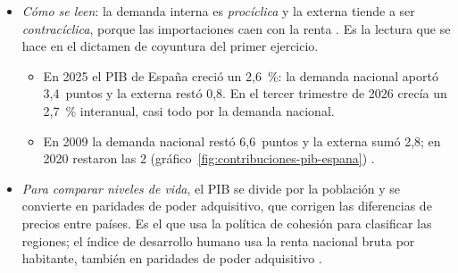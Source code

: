 \documentclass[11pt]{article}
\begin{document}
\begin{itemize}
  \begin{itemize}
  \item \emph{En palabras}: cada contribución es el \emph{peso} del componente en el año anterior por su \emph{crecimiento} de este año, y se mide en \uline{puntos porcentuales, no en porcentaje}. Las importaciones restan; las existencias también contribuyen.
  \item Por ejemplo, con un PIB de 100, si el consumo pesa 60~y crece un 2~\%, la inversión pesa 20~y crece un 5~\%, el consumo público pesa 20~y crece un 1~\%, y las exportaciones y las importaciones pesan 30~cada una y crecen un 4~y un 6~\%, la demanda interna aporta $1{,}2+1{,}0+0{,}2=2{,}4$ puntos, la externa resta $1{,}2-1{,}8=-0{,}6$, y el PIB crece un 1,8~\%.
  \item \emph{La cautela de los volúmenes encadenados}: los componentes en euros encadenados \emph{no suman} el PIB encadenado, salvo en el año de referencia y el siguiente (la ). Las contribuciones sí suman si cada peso es la participación \emph{nominal} del componente en el año anterior; por eso se usan las que publica el INE (anexo~\ref{anexo:encadenados})\nocite{Eurostat2013QNA}.
  \end{itemize}
\item \emph{Cómo se leen}: la demanda interna es \emph{procíclica} y la externa tiende a ser \emph{contracíclica}, porque las importaciones caen con la renta . Es la lectura que se hace en el dictamen de coyuntura del primer ejercicio.
  \begin{itemize}
  \item En 2025 el PIB de España creció un 2,6~\%: la demanda nacional aportó 3,4~puntos y la externa restó 0,8\nocite{INE2026CNA2025}. En el tercer trimestre de 2026 crecía un 2,7~\% interanual, casi todo por la demanda nacional\nocite{INE2026avCNTR3T26}.
  \item En 2009 la demanda nacional restó 6,6~puntos y la externa sumó 2,8; en 2020 restaron las 2 (gráfico~\ref{fig:contribuciones-pib-espana})\nocite{Eurostat2026nama10gdp} .
  \end{itemize}
\item \emph{Para comparar niveles de vida}, el PIB se divide por la población y se convierte en paridades de poder adquisitivo, que corrigen las diferencias de precios entre países. Es el que usa la política de cohesión para clasificar las regiones; el índice de desarrollo humano usa la renta nacional bruta por habitante, también en paridades de poder adquisitivo .
\end{itemize}
\end{document}
